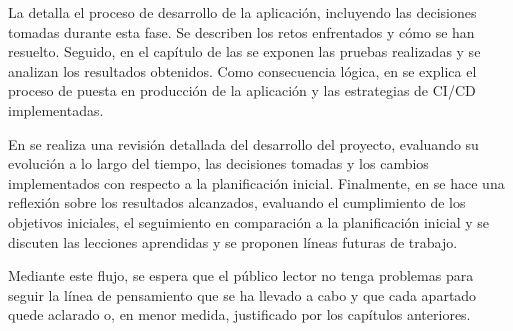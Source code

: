 La  detalla el proceso de desarrollo de la aplicación, incluyendo las decisiones tomadas durante esta fase. Se describen los retos enfrentados y cómo se han resuelto. Seguido, en el capítulo de las  se exponen las pruebas realizadas y se analizan los resultados obtenidos. Como consecuencia lógica, en  se explica el proceso de puesta en producción de la aplicación y las estrategias de CI/CD implementadas.

En  se realiza una revisión detallada del desarrollo del proyecto, evaluando su evolución a lo largo del tiempo, las decisiones tomadas y los cambios implementados con respecto a la planificación inicial. Finalmente, en  se hace una reflexión sobre los resultados alcanzados, evaluando el cumplimiento de los objetivos iniciales, el seguimiento en comparación a la planificación inicial y se discuten las lecciones aprendidas y se proponen líneas futuras de trabajo.

Mediante este flujo, se espera que el público lector no tenga problemas para seguir la línea de pensamiento que se ha llevado a cabo y que cada apartado quede aclarado o, en menor medida, justificado por los capítulos anteriores.
